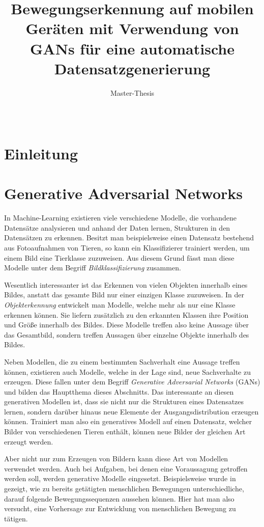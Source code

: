 \documentclass{hsflensburg}
\title{Bewegungserkennung auf mobilen Geräten mit Verwendung von GANs für eine automatische Datensatzgenerierung}
\subtitle{Master-Thesis}
\author{
  \name{Florian Hansen}\\
  \institution{Hochschule Flensburg}
}
\begin{document}
  \maketitle
  \tableofcontents

  \chapter{Einleitung}

  \chapter{Generative Adversarial Networks}
  In Machine-Learning existieren viele verschiedene Modelle, die vorhandene
  Datensätze analysieren und anhand der Daten lernen, Strukturen in den
  Datensätzen zu erkennen.  Besitzt man beispielsweise einen Datensatz
  bestehend aus Fotoaufnahmen von Tieren, so kann ein Klassifizierer trainiert
  werden, um einem Bild eine Tierklasse zuzuweisen. Aus diesem Grund fässt man
  diese Modelle unter dem Begriff \textit{Bildklassifizierung} zusammen.

  Wesentlich interessanter ist das Erkennen von vielen Objekten innerhalb eines
  Bildes, anstatt das gesamte Bild nur einer einzigen Klasse zuzuweisen. In der
  \textit{Objekterkennung} entwickelt man Modelle, welche mehr als nur eine
  Klasse erkennen können. Sie liefern zusätzlich zu den erkannten Klassen ihre
  Position und Größe innerhalb des Bildes. Diese Modelle treffen also keine
  Aussage über das Gesamtbild, sondern treffen Aussagen über einzelne Objekte
  innerhalb des Bildes.

  Neben Modellen, die zu einem bestimmten Sachverhalt eine Aussage treffen
  können, existieren auch Modelle, welche in der Lage sind, neue Sachverhalte zu
  erzeugen. Diese fallen unter dem Begriff \textit{Generative Adversarial
  Networks} (GANs) und bilden das Hauptthema dieses Abschnitts. Das interessante
  an diesen generativen Modellen ist, dass sie nicht nur die Strukturen eines
  Datensatzes lernen, sondern darüber hinaus neue Elemente der
  Ausgangsdistribution erzeugen können. Trainiert man also ein generatives
  Modell auf einen Datensatz, welcher Bilder von verschiedenen Tieren enthält,
  können neue Bilder der gleichen Art erzeugt werden.
  
  Aber nicht nur zum Erzeugen von Bildern kann diese Art von Modellen verwendet
  werden. Auch bei Aufgaben, bei denen eine Voraussagung getroffen werden soll,
  werden generative Modelle eingesetzt. Beispielsweise wurde in
  \cite{barsoum2017hpgan} gezeigt, wie zu bereits getätigten menschlichen
  Bewegungen unterschiedliche, darauf folgende Bewegungssequenzen aussehen
  können. Hier hat man also versucht, eine Vorhersage zur Entwicklung von
  menschlichen Bewegung zu tätigen.
\end{document}
